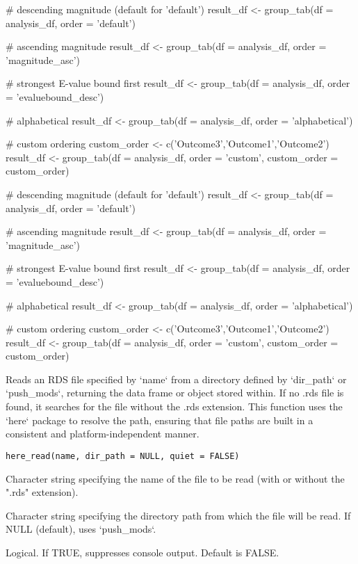 \documentclass[a4paper]{book}
\begin{document}
\begin{Examples}
\begin{ExampleCode}
# descending magnitude (default for 'default')
result_df <- group_tab(df = analysis_df, order = 'default')

# ascending magnitude
result_df <- group_tab(df = analysis_df, order = 'magnitude_asc')

# strongest E-value bound first
result_df <- group_tab(df = analysis_df, order = 'evaluebound_desc')

# alphabetical
result_df <- group_tab(df = analysis_df, order = 'alphabetical')

# custom ordering
custom_order <- c('Outcome3','Outcome1','Outcome2')
result_df <- group_tab(df = analysis_df, order = 'custom', custom_order = custom_order)

# descending magnitude (default for 'default')
result_df <- group_tab(df = analysis_df, order = 'default')

# ascending magnitude
result_df <- group_tab(df = analysis_df, order = 'magnitude_asc')

# strongest E-value bound first
result_df <- group_tab(df = analysis_df, order = 'evaluebound_desc')

# alphabetical
result_df <- group_tab(df = analysis_df, order = 'alphabetical')

# custom ordering
custom_order <- c('Outcome3','Outcome1','Outcome2')
result_df <- group_tab(df = analysis_df, order = 'custom', custom_order = custom_order)

\end{ExampleCode}
\end{Examples}
%
\begin{Description}
Reads an RDS file specified by `name` from a directory defined by `dir\_path` or `push\_mods`, returning the data frame or object stored within.
If no .rds file is found, it searches for the file without the .rds extension.
This function uses the `here` package to resolve the path, ensuring that file paths are built in a consistent and platform-independent manner.
\end{Description}
%
\begin{Usage}
\begin{verbatim}
here_read(name, dir_path = NULL, quiet = FALSE)
\end{verbatim}
\end{Usage}
%
\begin{Arguments}
\begin{ldescription}
\item[\code{name}] Character string specifying the name of the file to be read (with or without the ".rds" extension).

\item[\code{dir\_path}] Character string specifying the directory path from which the file will be read. If NULL (default), uses `push\_mods`.

\item[\code{quiet}] Logical. If TRUE, suppresses console output. Default is FALSE.
\end{ldescription}
\end{Arguments}
\end{document}
